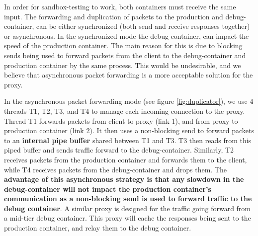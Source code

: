 In order for sandbox-testing to work, both containers must receive the same input.
The forwarding and duplication of packets to the production and debug-container, can be either synchronized (both send and receive responses together) or asynchronous.
In the synchronized mode the debug container, can impact the speed of the production container. 
The main reason for this is due to blocking sends being used to forward packets from the client to the debug-container and production container by the same process.
This would be undesirable, and we believe that asynchronous packet forwarding is a more acceptable solution for the proxy.

In the asynchronous packet forwarding mode (see figure \ref{fig:duplicator}), we use 4 threads T1, T2, T3, and T4 to manage each incoming connection to the proxy.
Thread T1 forwards packets from client to proxy (link 1), and from proxy to production container (link 2). 
It then uses a non-blocking send to forward packets to an \textbf{internal pipe buffer} shared between T1 and  T3. 
T3 then reads from this piped buffer and sends traffic forward to the debug-container. 
Similarly,  T2 receives packets from the production container and forwards them to the client, while T4 receives packets from the debug-container and drops them.
The \textbf{advantage of this asynchronous strategy is that any slowdown in the debug-container will not impact the production container's communication as a non-blocking send is used to forward traffic to the debug container}.
A similar proxy is designed for the traffic going forward from a mid-tier debug container. This proxy will cache the responses being sent to the production container, and relay them to the debug container. 

